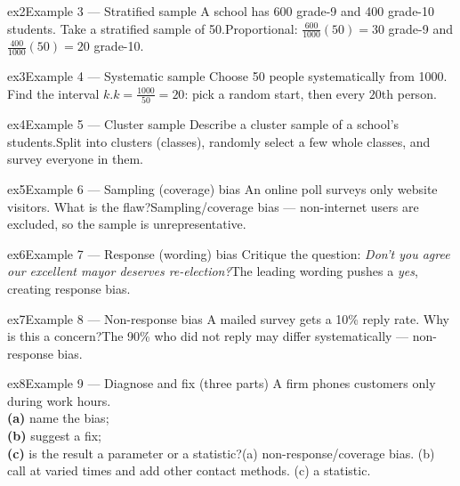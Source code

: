 \documentclass[11pt]{article}
\begin{document}
\begin{example}{ex2}{Example 3 --- Stratified sample}
A school has 600 grade-9 and 400 grade-10 students. Take a stratified sample of 50.\soln Proportional: $\tfrac{600}{1000}(50)=30$ grade-9 and $\tfrac{400}{1000}(50)=20$ grade-10.
\end{example}

\begin{example}{ex3}{Example 4 --- Systematic sample}
Choose 50 people systematically from 1000. Find the interval $k$.\soln $k=\tfrac{1000}{50}=20$: pick a random start, then every $20$th person.
\end{example}

\begin{example}{ex4}{Example 5 --- Cluster sample}
Describe a cluster sample of a school's students.\soln Split into clusters (classes), randomly select a few whole classes, and survey everyone in them.
\end{example}

\begin{example}{ex5}{Example 6 --- Sampling (coverage) bias}
An online poll surveys only website visitors. What is the flaw?\soln Sampling/coverage bias --- non-internet users are excluded, so the sample is unrepresentative.
\end{example}

\begin{example}{ex6}{Example 7 --- Response (wording) bias}
Critique the question: \emph{Don't you agree our excellent mayor deserves re-election?}\soln The leading wording pushes a \emph{yes}, creating response bias.
\end{example}

\begin{example}{ex7}{Example 8 --- Non-response bias}
A mailed survey gets a 10\% reply rate. Why is this a concern?\soln The 90\% who did not reply may differ systematically --- non-response bias.
\end{example}

\begin{example}{ex8}{Example 9 --- Diagnose and fix (three parts)}
A firm phones customers only during work hours. \\ \textbf{(a)} name the bias; \\ \textbf{(b)} suggest a fix; \\ \textbf{(c)} is the result a parameter or a statistic?\soln (a) non-response/coverage bias. (b) call at varied times and add other contact methods. (c) a statistic.
\end{example}
\end{document}
